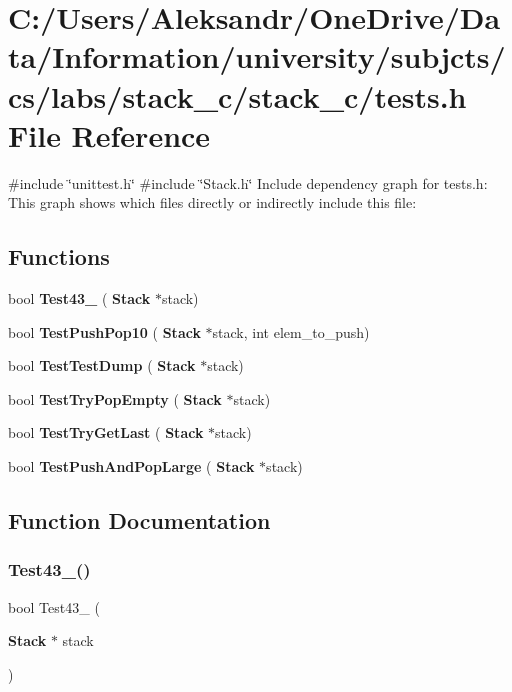 \section{C\+:/\+Users/\+Aleksandr/\+One\+Drive/\+Data/\+Information/university/subjcts/cs/labs/stack\+\_\+c/stack\+\_\+c/tests.h File Reference}
\label{tests_8h}
{\ttfamily \#include \char`\"{}unittest.\+h\char`\"{}}\newline
{\ttfamily \#include \char`\"{}Stack.\+h\char`\"{}}\newline
Include dependency graph for tests.\+h\+:
This graph shows which files directly or indirectly include this file\+:
\subsection*{Functions}
\begin{DoxyCompactItemize}
\item 
bool \textbf{ Test43\+\_} (\textbf{ Stack} $\ast$stack)
\item 
bool \textbf{ Test\+Push\+Pop10} (\textbf{ Stack} $\ast$stack, int elem\+\_\+to\+\_\+push)
\item 
bool \textbf{ Test\+Test\+Dump} (\textbf{ Stack} $\ast$stack)
\item 
bool \textbf{ Test\+Try\+Pop\+Empty} (\textbf{ Stack} $\ast$stack)
\item 
bool \textbf{ Test\+Try\+Get\+Last} (\textbf{ Stack} $\ast$stack)
\item 
bool \textbf{ Test\+Push\+And\+Pop\+Large} (\textbf{ Stack} $\ast$stack)
\end{DoxyCompactItemize}


\subsection{Function Documentation}
\mbox{\label{tests_8h_a493ef3151f86304ba8b029ecd4f182a6}} 
\subsubsection{Test43\+\_()}
{\footnotesize\ttfamily bool Test43\+\_ (\begin{DoxyParamCaption}\item[{\textbf{ Stack} $\ast$}]{stack }\end{DoxyParamCaption})}


